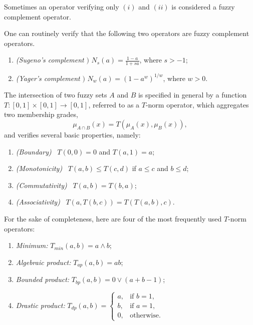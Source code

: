 \begin{remark} Sometimes an operator verifying only $(i)$ and $(ii)$ is considered a fuzzy complement operator.

\end{remark}

\begin{example} One can routinely verify that the following two operators are fuzzy complement operators.
\begin{enumerate}
  \item \textit{(Sugeno's complement} \cite{sugeno1993fuzzy}$)$ $\displaystyle N_s(a) = \frac{1-a}{1+sa}$, where $s > -1$;
  \vspace{.25em}
  \item \textit{(Yager's complement} \cite{yager1979measure}$)$ $N_w(a) = (1-a^w)^{1/w}$, where $w>0$.
\end{enumerate}

\end{example}

\begin{definition} The intersection of two fuzzy sets $A$ and $B$ is specified in general by a function $T:[0,1]\times [0,1] \to [0,1]$, referred to as a $T$-norm operator, which aggregates two membership grades,
\[
\mu_{A \cap B}(x) = T(\mu_A(x), \mu_B(x)),
\]
and verifies several basic properties, namely:
\begin{enumerate}
	\item \textit{(Boundary)} \ $T(0,0) = 0$ and $T(a,1) = a$;
	\item \textit{(Monotonicity)} \ $T(a,b) \le T(c,d)$ if $a \le c$ and $b \le d$;
	\item \textit{(Commutativity)} \ $T(a,b) = T(b,a)$;
	\item \textit{(Associativity)} \ $T(a, T(b,c)) = T(T(a,b),c)$.
\end{enumerate}

\end{definition}

For the sake of completeness, here are four of the most frequently used $T$-norm operators:

\begin{enumerate}
	\item \textit{Minimum:} $T_{min}(a,b) = a \land b$;
	\item \textit{Algebraic product:} $T_{ap}(a,b)=ab$;
	\item \textit{Bounded product:} $T_{bp}(a,b) = 0 \lor (a+b-1)$;
	\item \textit{Drastic product:} $T_{dp}(a,b) = \begin{cases}
	                                      a, & \text{if } b = 1,\\
	                                      b, & \text{if } a = 1,\\
	                                      0, & \text{otherwise}.
                                          \end{cases}$
\end{enumerate}

